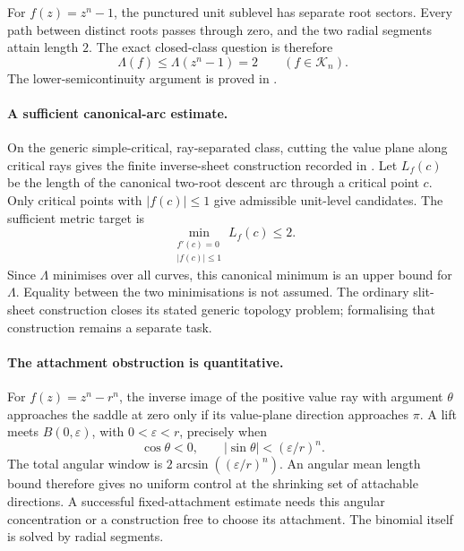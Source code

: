 \documentclass[11pt]{article}
\begin{document}
For $f(z)=z^n-1$, the punctured unit sublevel has separate root sectors.
Every path between distinct roots passes through zero, and the two radial
segments attain length $2$.  The exact closed-class question is therefore
\[
 \boxed{\Lambda(f)\le\Lambda(z^n-1)=2\qquad(f\in\mathcal K_n).}
\]
The lower-semicontinuity argument is proved in
.

\paragraph{A sufficient canonical-arc estimate.}
On the generic simple-critical, ray-separated class, cutting the value plane
along critical rays gives the finite inverse-sheet construction recorded in
.
Let $L_f(c)$ be the length of the canonical two-root descent arc through a
critical point $c$.  Only critical points with $|f(c)|\le1$ give admissible
unit-level candidates.  The sufficient metric target is
\[
 \min_{\substack{f'(c)=0\\|f(c)|\le1}}L_f(c)\le2.
\]
Since $\Lambda$ minimises over all curves, this canonical minimum is an upper
bound for $\Lambda$.  Equality between the two minimisations is not assumed.
The ordinary slit-sheet construction closes its stated generic topology
problem; formalising that construction remains a separate task.

\paragraph{The attachment obstruction is quantitative.}
For $f(z)=z^n-r^n$, the inverse image of the positive value ray with argument
$\theta$ approaches the saddle at zero only if its value-plane direction
approaches $\pi$.  A lift meets $B(0,\varepsilon)$, with $0<\varepsilon<r$,
precisely when
\[
 \cos\theta<0,\qquad
 |\sin\theta|<(\varepsilon/r)^n.
\]
The total angular window is $2\arcsin((\varepsilon/r)^n)$.  An angular mean
length bound therefore gives no uniform control at the shrinking set of
attachable directions.  A successful fixed-attachment estimate needs this
angular concentration or a construction free to choose its attachment.
The binomial itself is solved by radial segments.
\end{document}
